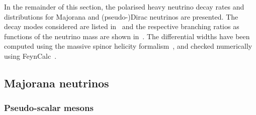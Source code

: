 In the remainder of this section, the polarised heavy neutrino decay rates and distributions %
for Majorana and (pseudo-)Dirac neutrinos are presented.
The decay modes considered are listed in~ and the respective branching ratios as functions of %
the neutrino mass are shown in~.
The differential widths have been computed using the massive spinor helicity formalism~\cite{Dittmaier:1998nn, Diaz-Cruz:2016ahc}, %
and checked numerically using FeynCalc~\cite{Shtabovenko:2016sxi,Mertig:1990an}.

\subsection{Majorana neutrinos}
\label{sec:decay_majorana}

\subsubsection{Pseudo-scalar mesons}
\label{sec:decay_pseudoscalar}

